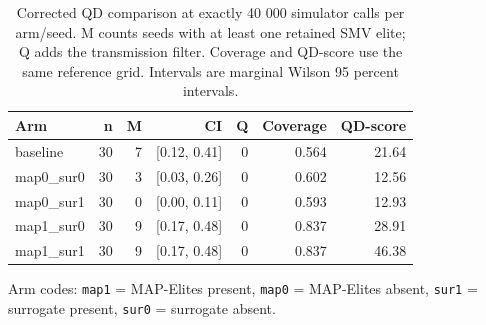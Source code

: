 \begin{table}[H]
\caption{Corrected QD comparison at exactly 40 000 simulator calls per arm/seed. M counts seeds with at least one retained SMV elite; Q adds the transmission filter. Coverage and QD-score use the same reference grid. Intervals are marginal Wilson 95 percent intervals.}
\label{tab:v2_qd}
\centering
\small
\begin{tabular}{@{}lrrrrrr@{}}
\toprule
Arm & n & M & CI & Q & Coverage & QD-score \\
\midrule
baseline & 30 & 7 & [0.12, 0.41] & 0 & 0.564 & 21.64 \\
map0\_sur0 & 30 & 3 & [0.03, 0.26] & 0 & 0.602 & 12.56 \\
map0\_sur1 & 30 & 0 & [0.00, 0.11] & 0 & 0.593 & 12.93 \\
map1\_sur0 & 30 & 9 & [0.17, 0.48] & 0 & 0.837 & 28.91 \\
map1\_sur1 & 30 & 9 & [0.17, 0.48] & 0 & 0.837 & 46.38 \\
\bottomrule
\end{tabular}
\vspace{2pt}

\noindent\footnotesize Arm codes: \texttt{map1} = MAP-Elites present, \texttt{map0} = MAP-Elites absent, \texttt{sur1} = surrogate present, \texttt{sur0} = surrogate absent.\normalsize
\end{table}
